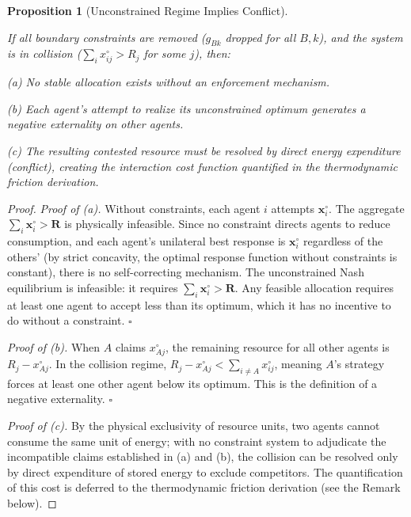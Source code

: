 \documentclass[11pt]{article}
\theoremstyle{plain}
\newtheorem{proposition}[theorem]{Proposition}
\theoremstyle{definition}
\theoremstyle{remark}
\begin{document}
\begin{proposition}[Unconstrained Regime Implies Conflict]
\label{prop-unconstrained-conflict}

If all boundary constraints are removed ($g_{Bk}$ dropped for all $B, k$), and the system is in collision ($\sum_i x_{ij}^{\circ} > R_j$ for some $j$), then:

(a) No stable allocation exists without an enforcement mechanism.

(b) Each agent's attempt to realize its unconstrained optimum generates a negative externality on other agents.

(c) The resulting contested resource must be resolved by direct energy expenditure (conflict), creating the interaction cost function quantified in the thermodynamic friction derivation.
\end{proposition}

\begin{proof}
\emph{Proof of (a).} Without constraints, each agent $i$ attempts $\mathbf{x}_i^{\circ}$. The aggregate $\sum_i \mathbf{x}_i^{\circ} > \mathbf{R}$ is physically infeasible. Since no constraint directs agents to reduce consumption, and each agent's unilateral best response is $\mathbf{x}_i^{\circ}$ regardless of the others' (by strict concavity, the optimal response function without constraints is constant), there is no self-correcting mechanism. The unconstrained Nash equilibrium is infeasible: it requires $\sum_i \mathbf{x}_i^{\circ} > \mathbf{R}$. Any feasible allocation requires at least one agent to accept less than its optimum, which it has no incentive to do without a constraint. $\square$

\emph{Proof of (b).} When $A$ claims $x_{Aj}^{\circ}$, the remaining resource for all other agents is $R_j - x_{Aj}^{\circ}$. In the collision regime, $R_j - x_{Aj}^{\circ} < \sum_{i \neq A} x_{ij}^{\circ}$, meaning $A$'s strategy forces at least one other agent below its optimum. This is the definition of a negative externality. $\square$

\emph{Proof of (c).} By the physical exclusivity of resource units, two agents cannot consume the same unit of energy; with no constraint system to adjudicate the incompatible claims established in (a) and (b), the collision can be resolved only by direct expenditure of stored energy to exclude competitors. The quantification of this cost is deferred to the thermodynamic friction derivation (see the Remark below).
\end{proof}
\end{document}
